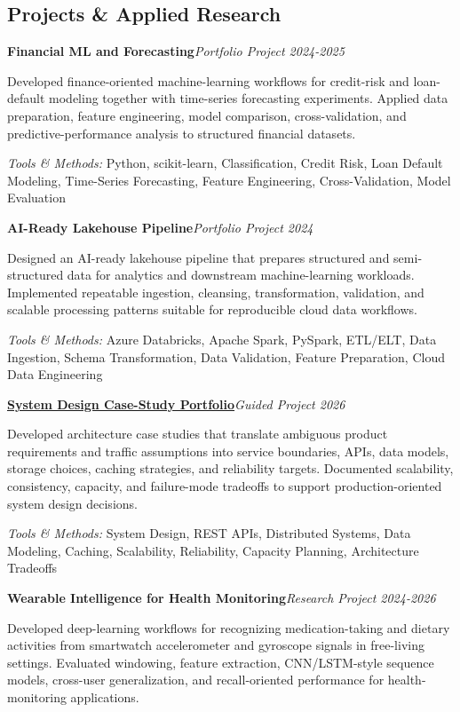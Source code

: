\documentclass[9pt,letterpaper]{extarticle}
\newcommand{\entry}[2]{\Needspace{4\baselineskip}\textbf{#1}\hfill\textit{#2}\par}
\begin{document}
\subsection{Projects \& Applied Research}
\entry{Financial ML and Forecasting}{Portfolio Project \textbar{} 2024-2025}
Developed finance-oriented machine-learning workflows for credit-risk and loan-default modeling together with time-series forecasting experiments. Applied data preparation, feature engineering, model comparison, cross-validation, and predictive-performance analysis to structured financial datasets.\par
{\small\textit{Tools \& Methods:} Python, scikit-learn, Classification, Credit Risk, Loan Default Modeling, Time-Series Forecasting, Feature Engineering, Cross-Validation, Model Evaluation\par}
\vspace{1pt}
\entry{AI-Ready Lakehouse Pipeline}{Portfolio Project \textbar{} 2024}
Designed an AI-ready lakehouse pipeline that prepares structured and semi-structured data for analytics and downstream machine-learning workloads. Implemented repeatable ingestion, cleansing, transformation, validation, and scalable processing patterns suitable for reproducible cloud data workflows.\par
{\small\textit{Tools \& Methods:} Azure Databricks, Apache Spark, PySpark, ETL/ELT, Data Ingestion, Schema Transformation, Data Validation, Feature Preparation, Cloud Data Engineering\par}
\vspace{1pt}
\entry{\href{https://github.com/WaseemRaza844/system-design-masterclass}{System Design Case-Study Portfolio}}{Guided Project \textbar{} 2026}
Developed architecture case studies that translate ambiguous product requirements and traffic assumptions into service boundaries, APIs, data models, storage choices, caching strategies, and reliability targets. Documented scalability, consistency, capacity, and failure-mode tradeoffs to support production-oriented system design decisions.\par
{\small\textit{Tools \& Methods:} System Design, REST APIs, Distributed Systems, Data Modeling, Caching, Scalability, Reliability, Capacity Planning, Architecture Tradeoffs\par}
\vspace{1pt}
\entry{Wearable Intelligence for Health Monitoring}{Research Project \textbar{} 2024-2026}
Developed deep-learning workflows for recognizing medication-taking and dietary activities from smartwatch accelerometer and gyroscope signals in free-living settings. Evaluated windowing, feature extraction, CNN/LSTM-style sequence models, cross-user generalization, and recall-oriented performance for health-monitoring applications.\par
\end{document}

